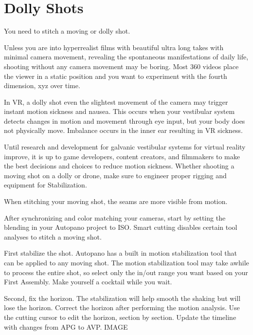 \chapter{Dolly Shots}
\pagecolor{white}
\label{chap:45}
\begin{fullwidth}

\problem

{\large You need to stitch a moving or dolly shot. \par}

Unless you are into hyperrealist films with beautiful ultra long takes with minimal camera movement, revealing the spontaneous manifestations of daily life, shooting without any camera movement may be boring. Most 360 videos place the viewer in a static position and you want to experiment with the fourth dimension, xyz over time.

In VR, a dolly shot even the slightest movement of the camera may trigger instant motion sickness and nausea. This occurs when your vestibular system detects changes in motion and movement through eye input, but your body does not physically move. Imbalance occurs in the inner ear resulting in VR sickness. 

Until research and development for galvanic vestibular systems for virtual reality improve, it is up to game developers, content creators, and filmmakers to make the best decisions and choices to reduce motion sickness. Whether shooting a moving shot on a dolly or drone, make sure to engineer proper rigging and equipment for Stabilization. 

When stitching your moving shot, the seams are more visible from motion.

\solution

After synchronizing and color matching your cameras, start by setting the blending in your Autopano project to ISO. Smart cutting disables certain tool analyses to stitch a moving shot. 

First stabilize the shot. Autopano has a built in motion stabilization tool that can be applied to any moving shot. The motion stabilization tool may take awhile to process the entire shot, so select only the in/out range you want based on your First Assembly. Make yourself a cocktail while you wait.

Second, fix the horizon. The stabilization will help smooth the shaking but will lose the horizon. Correct the horizon after performing the motion analysis. Use the cutting cursor to edit the horizon, section by section. Update the timeline with changes from APG to AVP. IMAGE


\end{fullwidth}
